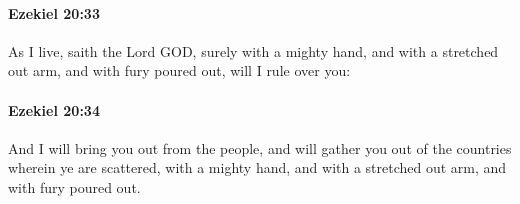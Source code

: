 		\paragraph{Ezekiel 20:33} %
			\label{EZEKIEL-20-33}

			As I live, saith the Lord GOD, surely with a mighty hand, and with a stretched out arm, and with fury poured out, will I rule over you:


		\paragraph{Ezekiel 20:34} %
			\label{EZEKIEL-20-34}

			And I will bring you out from the people, and will gather you out of the countries wherein ye are scattered, with a mighty hand, and with a stretched out arm, and with fury poured out.


